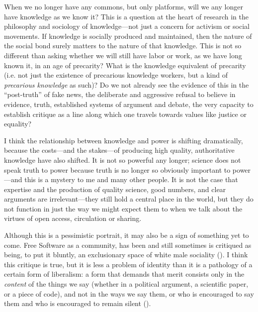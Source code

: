 \documentclass[11pt]{article}
\begin{document}
When we no longer have any commons, but only platforms, will we any longer have knowledge as we know it?  This is a question at the heart of research in the philosophy and sociology of knowledge---not just a concern for activism or social movements.  If knowledge is socially produced and maintained, then the nature of the social bond surely matters to the nature of that knowledge.   This is not so different than asking whether we  will still have labor or work, as we have long known it, in an age of precarity?  What is the knowledge equivalent of precarity (i.e. not just the existence of precarious knowledge workers, but a kind of \emph{precarious knowledge} as such)?  Do we not already see the evidence of this in the ``post-truth'' of fake news, the deliberate and aggressive refusal to believe in evidence, truth, established systems of argument and debate, the very capacity to establish critique as a line along which one travels towards values like justice or equality?

I think the relationship between knowledge and power is shifting dramatically, because the costs---and the stakes---of producing high quality, authoritative knowledge have also shifted.  It is not so powerful any longer; science does not speak truth to power because truth is no longer so obviously important to power---and this is a mystery to me and many other people.  It is not the case that expertise and the production of quality science, good numbers, and clear arguments are irrelevant---they still hold a central place in the world, but they do not function in just the way we might expect them to when we talk about the virtues of open access, circulation or sharing. 

Although this is a pessimistic portrait, it may also be a sign of something yet to come.  Free Software as a community, has been and still sometimes is critiqued as being, to put it bluntly, an exclusionary space of white male sociality (\cite{nafus_patches_2012,massanari2016fapp,ford2017canedit,reagle2013freeassexis}).  I think this critique is true, but it is less a problem of identity than it is a pathology of a certain form of liberalism: a form that demands that merit consists only in the \emph{content} of the things we say (whether in a political argument, a scientific paper, or a piece of code), and not in the ways we say them, or who is encouraged to say them and who is encouraged to remain silent (\cite{dunbar-hester_low_2014}).
\end{document}
